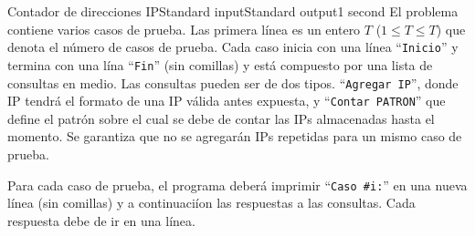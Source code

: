 \begin{problem}{Contador de direcciones IP}{Standard input}{Standard output}{1 second}{}
\InputFile
El problema contiene varios casos de prueba. Las primera l\'inea es un entero $T$ ($1 \leq T \leq T$) que denota el n\'umero de casos de prueba. Cada caso inicia con una l\'inea ``\texttt{Inicio}'' y termina con una l\'ina ``\texttt{Fin}'' (sin comillas) y está compuesto por una lista de consultas en medio. Las consultas pueden ser de dos tipos. ``\texttt{Agregar IP}'', donde IP tendr\'a el formato de una IP v\'alida antes expuesta, y ``\texttt{Contar PATRON}'' que define el patr\'on sobre el cual se debe de contar las IPs almacenadas hasta el momento. Se garantiza que no se agregar\'an IPs repetidas para un mismo caso de prueba.

\OutputFile
Para cada caso de prueba, el programa deber\'a imprimir ``\texttt{Caso \#i:}'' en una nueva l\'inea (sin comillas) y a continuaci\'ion las respuestas a las consultas. Cada respuesta debe de ir en una l\'inea.

\Example

\begin{example}
\end{example}

\end{problem}
